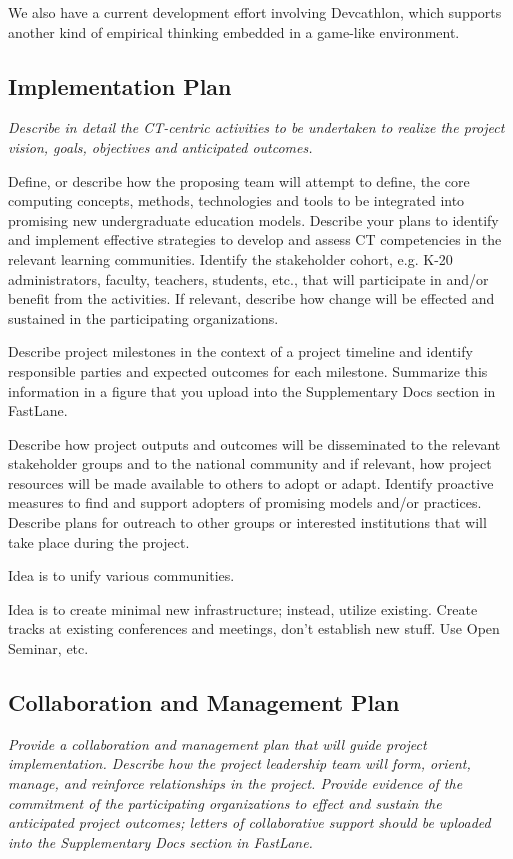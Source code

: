 We also have a current development effort involving Devcathlon, which supports another kind of empirical thinking embedded in a game-like environment. 

\subsection{Implementation Plan}

{\em Describe in detail the CT-centric activities to be undertaken to realize the project vision, goals, objectives and anticipated outcomes. 

Define, or describe how the proposing team will attempt to define, the core computing concepts, methods, technologies and tools to be integrated into promising new undergraduate education models.  Describe your plans to identify and implement effective strategies to develop and assess CT competencies in the relevant learning communities.  Identify the stakeholder cohort, e.g. K-20 administrators, faculty, teachers, students, etc., that will participate in and/or benefit from the activities. If relevant, describe how change will be effected and sustained in the participating organizations.  

Describe project milestones in the context of a project timeline and identify responsible parties and expected outcomes for each milestone.  Summarize this information in a figure that you upload into the Supplementary Docs section in FastLane. 

Describe how project outputs and outcomes will be disseminated to the relevant stakeholder groups and to the national community and if relevant, how project resources will be made available to others to adopt or adapt. Identify proactive measures to find and support adopters of promising models and/or practices. Describe plans for outreach to other groups or interested institutions that will take place during the project.  
}

Idea is to unify various communities.

Idea is to create minimal new infrastructure; instead, utilize existing.  Create tracks at existing conferences and meetings, don't establish new stuff.  Use Open Seminar, etc. 


\subsection{Collaboration and Management Plan}

{\em Provide a collaboration and management plan that will guide project implementation.  Describe how the project leadership team will form, orient, manage, and reinforce relationships in the project.  Provide evidence of the commitment of the participating organizations to effect and sustain the anticipated project outcomes; letters of collaborative support should be uploaded into the Supplementary Docs section in FastLane. }

